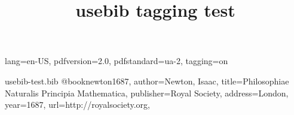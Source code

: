 \DocumentMetadata
  {
    lang=en-US,
    pdfversion=2.0,
    pdfstandard=ua-2,
    tagging=on
  }
\begin{filecontents}{usebib-test.bib}
@book{newton1687,
author={Newton, Isaac},
title={Philosophiae Naturalis Principia Mathematica},
publisher={Royal Society},
address={London},
year={1687},
url={http://royalsociety.org},
}
\end{filecontents}
\documentclass{article}

\usepackage{hyperref}
\usepackage{usebib}

\title{usebib tagging test}




\cite{newton1687} published by the  of . See .





